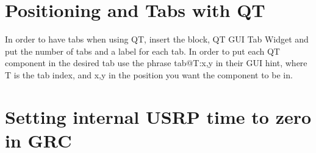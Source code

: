 \section{Positioning and Tabs with QT}

In order to have tabs when using QT, insert the block, QT GUI Tab Widget and put the number of tabs and a label for each tab. In order to put each QT component in the desired tab use the phrase tab@T:x,y in their GUI hint, where T is the tab index, and x,y in the position you want the component to be in.

\section{Setting internal USRP time to zero in GRC}
